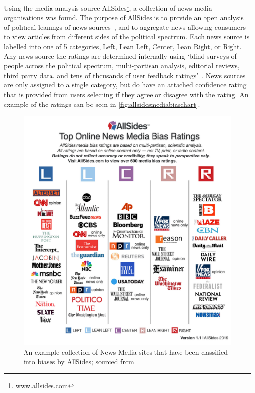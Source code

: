 Using the media analysis source AllSides\footnote{www.allsides.com}, a collection of news-media organisations was found. The purpose of AllSides is to provide an open  analysis of political leanings of news sources~, and to aggregate news allowing consumers to view articles from different sides of the political spectrum. Each news source is labelled into one of 5 categories, Left, Lean Left, Center, Lean Right, or Right. Any news source the ratings are determined internally using `blind surveys of people across the political spectrum, multi-partisan analysis, editorial reviews, third party data, and tens of thousands of user feedback ratings'~. News sources are only assigned to a single category, but do have an attached confidence rating that is provided from users selecting if they agree or disagree with the rating. An example of the ratings can be seen in \autoref{fig:allsidesmediabiaschart}.

\begin{figure}
	\centering
	\includegraphics[width=0.9\linewidth]{chapter1/figs/AllSidesMediaBiasChart}
	\caption{An example collection of News-Media sites that have been classified into biases by AllSides; sourced from }
	\label{fig:allsidesmediabiaschart}
\end{figure}




